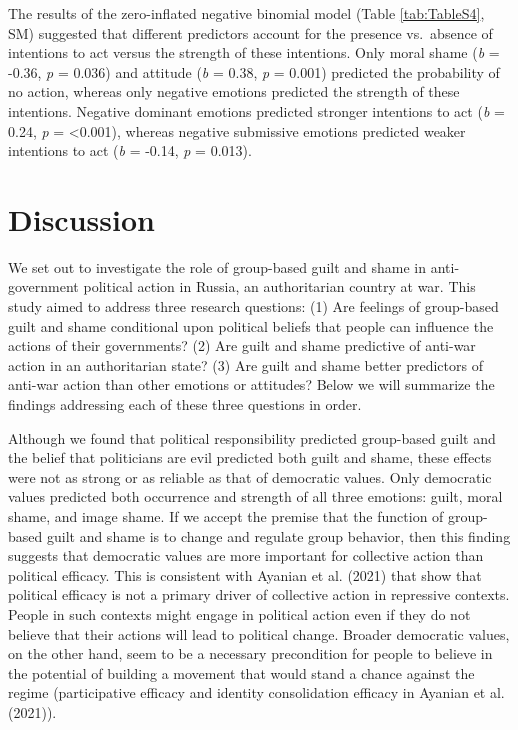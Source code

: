 \documentclass[
]{article}
\begin{document}
The results of the zero-inflated negative binomial model (Table \ref{tab:TableS4}, SM) suggested that different predictors account for the presence vs.~absence of intentions to act versus the strength of these intentions. Only moral shame (\emph{b} = -0.36, \emph{p} = 0.036) and attitude (\emph{b} = 0.38, \emph{p} = 0.001) predicted the probability of no action, whereas only negative emotions predicted the strength of these intentions. Negative dominant emotions predicted stronger intentions to act (\emph{b} = 0.24, \emph{p} = \textless0.001), whereas negative submissive emotions predicted weaker intentions to act (\emph{b} = -0.14, \emph{p} = 0.013).

\allsectionsfont{\centering}

\hypertarget{discussion}{%
\section*{Discussion}\label{discussion}}

We set out to investigate the role of group-based guilt and shame in anti-government political action in Russia, an authoritarian country at war. This study aimed to address three research questions: (1) Are feelings of group-based guilt and shame conditional upon political beliefs that people can influence the actions of their governments? (2) Are guilt and shame predictive of anti-war action in an authoritarian state? (3) Are guilt and shame better predictors of anti-war action than other emotions or attitudes? Below we will summarize the findings addressing each of these three questions in order.

Although we found that political responsibility predicted group-based guilt and the belief that politicians are evil predicted both guilt and shame, these effects were not as strong or as reliable as that of democratic values. Only democratic values predicted both occurrence and strength of all three emotions: guilt, moral shame, and image shame. If we accept the premise that the function of group-based guilt and shame is to change and regulate group behavior, then this finding suggests that democratic values are more important for collective action than political efficacy. This is consistent with Ayanian et al. (2021) that show that political efficacy is not a primary driver of collective action in repressive contexts. People in such contexts might engage in political action even if they do not believe that their actions will lead to political change. Broader democratic values, on the other hand, seem to be a necessary precondition for people to believe in the potential of building a movement that would stand a chance against the regime (participative efficacy and identity consolidation efficacy in Ayanian et al. (2021)).
\end{document}
